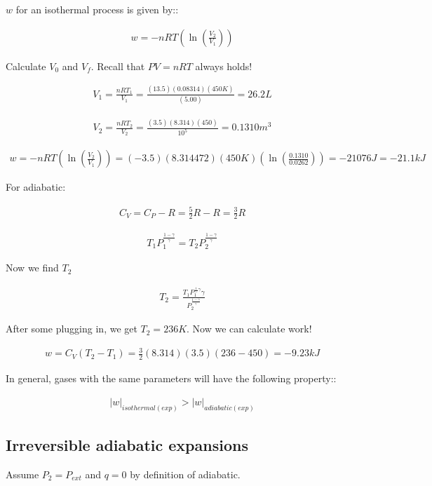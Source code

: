 \documentclass[12pt]{article}
\begin{document}
$w$ for an isothermal process is given by::

\begin{align*}
    w=-nRT(\ln(\frac{V_2}{V_1}))
\end{align*}

Calculate $V_0$ and $V_f$. Recall that $PV=nRT$ always holds!

\begin{align*}
    V_1=\frac{nRT_1}{V_1}=\frac{(13.5)(0.08314)(450K)}{(5.00)}=26.2L
\end{align*}

\begin{align*}
    V_2=\frac{nRT_2}{V_2}=\frac{(3.5)(8.314)(450)}{10^5}=0.1310m^3
\end{align*}

\begin{align*}
    w=-nRT(\ln(\frac{V_2}{V_1}))=(-3.5)(8.314472)(450K)(\ln(\frac{0.1310}{0.0262}))=-21076J=-21.1kJ
\end{align*}

For adiabatic:

\begin{align*}
    C_V=C_P-R=\frac{5}{2}R-R=\frac{3}{2}R
\end{align*}

\begin{align*}
    T_1P_1^{\frac{1-\gamma}{\gamma}}=T_2P_2^{\frac{1-\gamma}{\gamma}}
\end{align*}

Now we find $T_2$

\begin{align*}
    T_2=\frac{T_1P_1^{\frac
    1-\gamma}{\gamma}}{P_2^{\frac{1-\gamma}{\gamma}}}
\end{align*}

After some plugging in, we get $T_2=236K$. Now we can calculate work!

\begin{align*}
    w=C_V(T_2-T_1)=\frac{3}{2}(8.314)(3.5)(236-450)=-9.23kJ
\end{align*}

In general, gases with the same parameters will have the following property::

\begin{align*}
    |w|_{isothermal(exp)}>|w|_{adiabatic(exp)}
\end{align*}

\subsection*{Irreversible adiabatic expansions}
Assume $P_2=P_{ext}$ and $q=0$ by definition of adiabatic.
\end{document}
